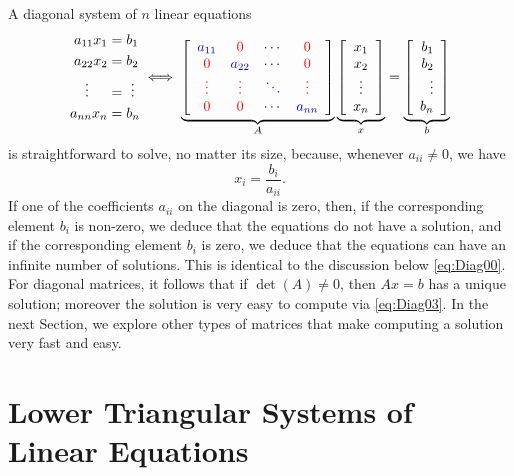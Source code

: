 A diagonal system of $n$ linear equations 
\begin{equation} 
\label{eq:Diag02}
\begin{aligned}
     a_{11} x_1 &=b_1\\
      a_{22}x_2 &= b_2\\
      \vdots~~~~ &=   ~    \vdots \\
 a_{nn} x_n  &= b_n
    \end{aligned}\iff \underbrace{\left[\begin{array}{cccc} \color{blue} a_{11} & \color{red} 0 & \cdots & \color{red} 0\\
\color{red} 0& \color{blue} a_{22} & \cdots & \color{red} 0 \\ \color{red} \vdots & \color{red} \vdots & \color{blue} \ddots& \color{red} \vdots \\
\color{red} 0 & \color{red} 0 & \cdots & \color{blue} a_{nn}\\\end{array}\right]}_{A}  \underbrace{\left[\begin{array}{c} x_1 \\x_2 \\ \vdots\\x_n\end{array} \right]}_{x}
= \underbrace{\left[\begin{array}{r} b_1 \\b_2 \\ \vdots \\b_n\end{array} \right]}_{b}
\end{equation}
is straightforward to solve, no matter its size, because, whenever $a_{ii} \neq 0$, we have 
\begin{equation}
\label{eq:Diag03}
    x_i = \frac{b_i}{a_{ii}}.
\end{equation}
If one of the coefficients $a_{ii}$ on the diagonal is zero, then, if the corresponding element $b_i$ is non-zero, we deduce that the equations do not have a solution, and if the corresponding element $b_i$ is zero, we deduce that the equations can have an infinite number of solutions. This is identical to the discussion below \eqref{eq:Diag00}. \\

For diagonal matrices, it follows that if $\det(A) \neq 0$, then $Ax=b$ has a unique solution; moreover the solution is very easy to compute via \eqref{eq:Diag03}. In the next Section, we explore other types of matrices that make computing a solution very fast and easy.

\section{Lower Triangular Systems of Linear Equations}

